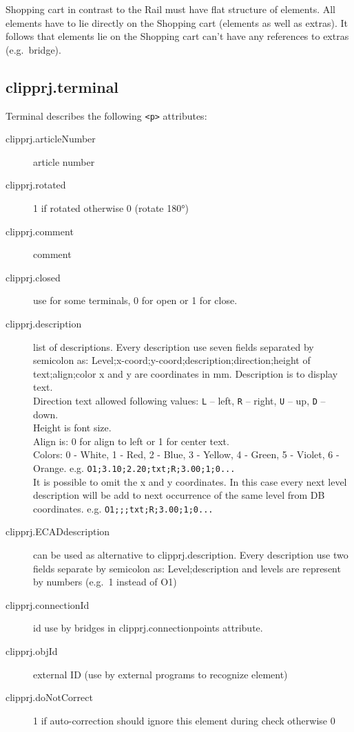 \documentclass[%
	a4paper,
	oneside,
	listof=numbered,
	parskip=half,
	headsepline=true,
	footsepline=false,
	normalheadings,
	0.7headlines,
	headexclude,
	]{scrbook}
\begin{document}
Shopping cart in contrast to the Rail must have flat structure of elements.
All elements have to lie directly on the Shopping cart (elements as well as extras).
It follows that elements lie on the Shopping cart can’t have any references to extras (e.g.\ bridge).

\subsection{clipprj.terminal} 
 
Terminal describes the following \verb|<p>| attributes: 

\begin{description}
	\item[clipprj.articleNumber] article number 
	\item[clipprj.rotated] 1 if rotated otherwise 0 (rotate 180°) 
	\item[clipprj.comment] comment 
	\item[clipprj.closed] use for some terminals, 0 for open or 1 for close. 
	\item[clipprj.description] list of descriptions.
	Every description use seven fields separated by semicolon as: Level;x-coord;y-coord;description;direction;height of text;align;color x and y are coordinates in mm.
	Description is to display text.\\
	Direction text allowed following values: 
	\verb|L| – left, \verb|R| – right, \verb|U| – up, \verb|D| – down.\\
	Height is font size.\\
	Align is: 0 for align to left or 1 for center text.\\
	Colors: 0 - White, 1 - Red, 2 - Blue, 3 - Yellow, 4 - Green, 5 - Violet, 6 - Orange.
	e.g. \verb|O1;3.10;2.20;txt;R;3.00;1;0...|\\
	It is possible to omit the x and y coordinates.
	In this case every next level description will be add to next occurrence of the same level from DB coordinates.
	e.g. \verb|O1;;;txt;R;3.00;1;0...|
	\item[clipprj.ECADdescription] can be used as alternative to clipprj.description.
	Every description use two fields separate by semicolon as: Level;description and levels are represent by numbers (e.g.\ 1 instead of O1)
	\item[clipprj.connectionId] id use by bridges in clipprj.connectionpoints attribute. 
	\item[clipprj.objId] external ID (use by external programs to recognize element) 
	\item[clipprj.doNotCorrect] 1 if auto-correction should ignore this element during check otherwise 0 
\end{description}
\end{document}
